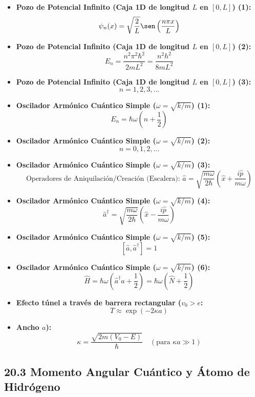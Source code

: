 \documentclass[11pt,a4paper]{article}
\begin{document}
\begin{itemize}
  \item \textbf{Pozo de Potencial Infinito (Caja 1D de longitud $L$ en $[0, L]$) (1):}
  \[
    \psi_n(x) = \sqrt{\frac{2}{L}}\sen\left( \frac{n\pi x}{L} \right)
  \]
  \item \textbf{Pozo de Potencial Infinito (Caja 1D de longitud $L$ en $[0, L]$) (2):}
  \[
    E_n = \frac{n^2 \pi^2 \hbar^2}{2m L^2} = \frac{n^2 h^2}{8m L^2}
  \]
  \item \textbf{Pozo de Potencial Infinito (Caja 1D de longitud $L$ en $[0, L]$) (3):}
  \[
    n = 1, 2, 3, \dots
  \]
  \item \textbf{Oscilador Armónico Cuántico Simple ($\omega = \sqrt{k/m}$) (1):}
  \[
    E_n = \hbar\omega \left( n + \frac{1}{2} \right)
  \]
  \item \textbf{Oscilador Armónico Cuántico Simple ($\omega = \sqrt{k/m}$) (2):}
  \[
    n = 0, 1, 2, \dots
  \]
  \item \textbf{Oscilador Armónico Cuántico Simple ($\omega = \sqrt{k/m}$) (3):}
  \[
    \text{Operadores de Aniquilación/Creación (Escalera): } \hat{a} = \sqrt{\frac{m\omega}{2\hbar}}\left(\hat{x} + \frac{i\hat{p}}{m\omega}\right)
  \]
  \item \textbf{Oscilador Armónico Cuántico Simple ($\omega = \sqrt{k/m}$) (4):}
  \[
    \hat{a}^\dagger = \sqrt{\frac{m\omega}{2\hbar}}\left(\hat{x} - \frac{i\hat{p}}{m\omega}\right)
  \]
  \item \textbf{Oscilador Armónico Cuántico Simple ($\omega = \sqrt{k/m}$) (5):}
  \[
    [\hat{a}, \hat{a}^\dagger] = 1
  \]
  \item \textbf{Oscilador Armónico Cuántico Simple ($\omega = \sqrt{k/m}$) (6):}
  \[
    \hat{H} = \hbar\omega\left(\hat{a}^\dagger \hat{a} + \frac{1}{2}\right) = \hbar\omega\left(\hat{N} + \frac{1}{2}\right)
  \]
  \item \textbf{Efecto túnel a través de barrera rectangular ($v_0 > e$:}
  \[
    T \approx \exp(-2\kappa a)
  \]
  \item \textbf{Ancho $a$):}
  \[
    \kappa = \frac{\sqrt{2m(V_0 - E)}}{\hbar} \quad (\text{para } \kappa a \gg 1)
  \]
\end{itemize}

\subsection*{20.3 Momento Angular Cuántico y Átomo de Hidrógeno}
\end{document}

